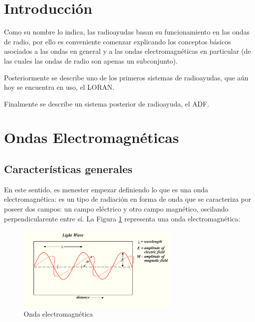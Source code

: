 








\section{Introducci\'on}

Como su nombre lo indica, las radioayudas basan su funcionamiento en las ondas de radio,
por ello es conveniente comenzar explicando los conceptos b\'asicos asociados a las ondas en general y a las ondas electromagn\'eticas en particular (de las cuales las ondas de radio son apenas un subconjunto).

Posteriormente se describe uno de los primeros sistemas de radioayudas, que a\'un hoy se encuentra en uso, el LORAN.

Finalmente se describe un sistema posterior de radioayuda, el ADF.

\section{ Ondas Electromagn\'eticas }

\subsection{Caracter\'isticas generales}

En este sentido, es menester empezar definiendo lo que es una onda electromagn\'etica: es un tipo de radiaci\'on en forma de onda que se caracteriza por poseer dos campos: un campo el\'ectrico y otro campo magn\'etico, oscilando perpendicularente entre s\'i. La Figura \ref{fig:onda-electromagnetica} representa una onda electromagn\'etica: 

\begin{figure}[!h]
  \centering
  \includegraphics[width=0.7\textwidth]{Imagenes/06.01.adf/onda-electromagnetica.png}  
  \caption{Onda electromagn\'etica \cite{wikipedia_esp}}
  \label{fig:onda-electromagnetica}
\end{figure}


